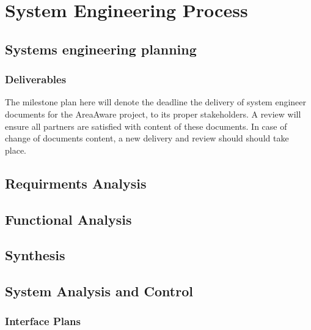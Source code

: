 %
\thispagestyle{fancy}
\chapter{System Engineering Process}
\label{chp:se_process}

\section{Systems engineering planning}

\subsection{Deliverables}
\label{plan:deliverables}
The milestone plan here will denote the deadline the delivery of system engineer documents for the AreaAware project, to its proper stakeholders.
A review will ensure all partners are satisfied with content of these documents.
In case of change of documents content, a new delivery and review should should take place.



\section{Requirments Analysis}



\section{Functional Analysis}



\section{Synthesis}



\section {System Analysis and Control}

\subsection{Interface Plans}
